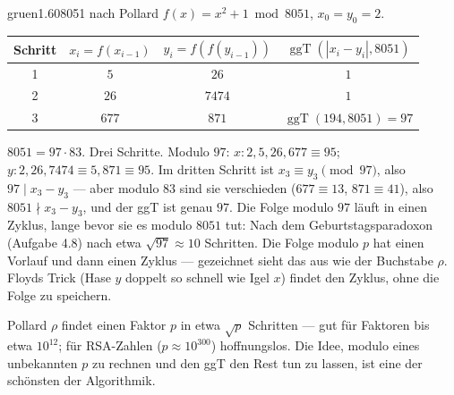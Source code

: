 \begin{loesungkarte}{gruen}{1.60}{8051 nach Pollard}
$f(x) = x^{2} + 1\bmod8051$, $x_0 = y_0 = 2$.
\begin{center}
{\small\renewcommand{\arraystretch}{1.3}
\begin{tabular}{@{}c|ccc@{}}
Schritt & $x_i = f(x_{i-1})$ & $y_i = f(f(y_{i-1}))$ & $\operatorname{ggT}(|x_i - y_i|, 8051)$\\\hline
1 & $5$ & $26$ & $1$\\
2 & $26$ & $7474$ & $1$\\
3 & $677$ & $871$ & $\operatorname{ggT}(194, 8051) = 97$\\
\end{tabular}}
\end{center}
$8051 = 97\cdot83$. Drei Schritte.
Modulo $97$: $x\colon2, 5, 26, 677\equiv95$; $y\colon2, 26, 7474\equiv5, 871\equiv95$. Im dritten Schritt ist $x_3\equiv y_3\pmod{97}$, also $97\mid x_3 - y_3$ --- aber modulo $83$ sind sie verschieden ($677\equiv13$, $871\equiv41$), also $8051\nmid x_3 - y_3$, und der ggT ist genau $97$. Die Folge modulo $97$ läuft in einen Zyklus, lange bevor sie es modulo $8051$ tut: Nach dem Geburtstagsparadoxon (Aufgabe 4.8) nach etwa $\sqrt{97}\approx10$ Schritten.
Die Folge modulo $p$ hat einen Vorlauf und dann einen Zyklus --- gezeichnet sieht das aus wie der Buchstabe $\rho$. Floyds Trick (Hase $y$ doppelt so schnell wie Igel $x$) findet den Zyklus, ohne die Folge zu speichern.
\begin{mitnehmen}\kastentext
Pollard $\rho$ findet einen Faktor $p$ in etwa $\sqrt p$ Schritten --- gut für Faktoren bis etwa $10^{12}$; für RSA-Zahlen ($p\approx10^{300}$) hoffnungslos. Die Idee, modulo eines unbekannten $p$ zu rechnen und den ggT den Rest tun zu lassen, ist eine der schönsten der Algorithmik.
\end{mitnehmen}
\end{loesungkarte}

